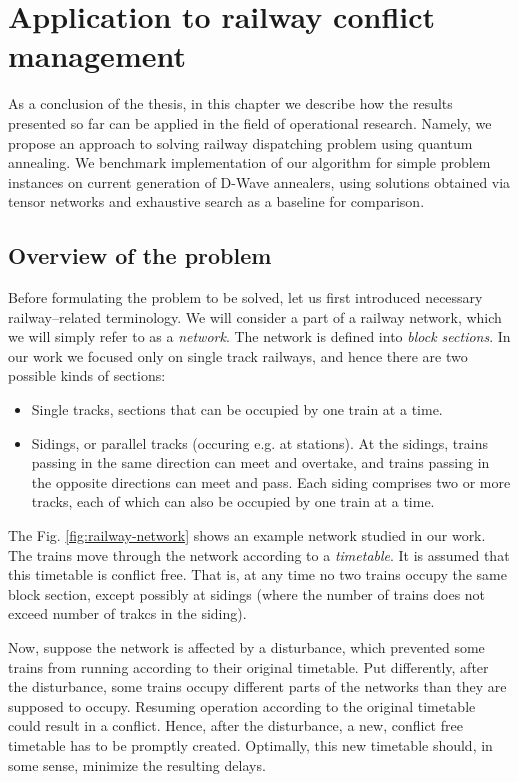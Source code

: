 \chapter{Application to railway conflict management}

As a conclusion of the thesis, in this chapter we describe how the results presented so far can be
applied in the field of operational research. Namely, we propose an approach to solving railway
dispatching problem using quantum annealing. We benchmark implementation of our algorithm for
simple problem instances on current generation of D-Wave annealers, using solutions obtained via
tensor networks and exhaustive search as a baseline for comparison.


\section{Overview of the problem}
Before formulating the problem to be solved, let us first introduced necessary railway--related
terminology. We will consider a part of a railway network, which we will simply refer to as a
\emph{network}. The network is defined into \emph{block sections}. In our work we focused only on
single track railways, and hence there are two possible kinds of sections:
\begin{itemize}
    \item Single tracks, sections that can be occupied by one train at a time.
    \item Sidings, or parallel tracks (occuring e.g. at stations). At the sidings, trains passing
      in the same direction can meet and overtake, and trains passing in the opposite directions
      can meet and pass. Each siding comprises two or more tracks, each of which can also be
      occupied by one train at a time.
\end{itemize}

The Fig. \ref{fig:railway-network} shows an example network studied in our work. The trains move
through the network according to a \emph{timetable}. It is assumed that this timetable is conflict
free. That is, at any time no two trains occupy the same block section, except possibly at sidings
(where the number of trains does not exceed number of trakcs in the siding).

Now, suppose the network is affected by a disturbance, which prevented some trains from running
according to their original timetable. Put differently, after the disturbance, some trains occupy
different parts of the networks than they are supposed to occupy. Resuming operation according to
the original timetable could result in a conflict. Hence, after the disturbance, a new, conflict
free timetable has to be promptly created. Optimally, this new timetable should, in some sense,
minimize the resulting delays.

